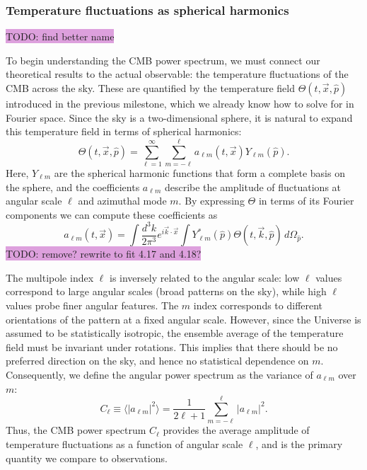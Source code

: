 \documentclass{aa}
\numberwithin{equation}{section}
\numberwithin{table}{section}
\numberwithin{figure}{section}
\begin{document}
\subsubsection{Temperature fluctuations as spherical harmonics}
\colorbox{Plum}{TODO: find better name}

To begin understanding the CMB power spectrum, we must connect our theoretical results to the actual observable: the temperature fluctuations of the CMB across the sky. These are quantified by the temperature field $\Theta(t,\vec{x},\hat{p})$ introduced in the previous milestone, which we already know how to solve for in Fourier space. 
Since the sky is a two-dimensional sphere, it is natural to expand this temperature field in terms of spherical harmonics:  
\begin{equation}
\Theta(t, \vec{x}, \hat{p}) = \sum_{\ell=1}^{\infty} \sum_{m=-\ell}^{\ell} a_{\ell m}(t, \vec{x}) Y_{\ell m}(\hat{p}).
\end{equation}
Here, $Y_{\ell m}$ are the spherical harmonic functions that form a complete basis on the sphere, and the coefficients $a_{\ell m}$ describe the amplitude of fluctuations at angular scale $\ell$ and azimuthal mode $m$. By expressing $\Theta$ in terms of its Fourier components we can compute these coefficients as
\begin{equation}
  a_{\ell m}(t,\vec{x}) = \int\frac{d^3k}{2\pi^3}e^{i\vec{k}\cdot\vec{x}}\int Y^*_{\ell m}(\hat{p})\Theta(t,\vec{k},\hat{p})\,d\Omega_{\hat{p}}. \label{eq: coeffs}
\end{equation}
\colorbox{Plum}{TODO: remove? rewrite to fit 4.17 and 4.18?}

The multipole index $\ell$ is inversely related to the angular scale: low $\ell$ values correspond to large angular scales (broad patterns on the sky), while high $\ell$ values probe finer angular features. The $m$ index corresponds to different orientations of the pattern at a fixed angular scale. However, since the Universe is assumed to be statistically isotropic, the ensemble average of the temperature field must be invariant under rotations. This implies that there should be no preferred direction on the sky, and hence no statistical dependence on $m$. Consequently, we define the angular power spectrum as the variance of $a_{\ell m}$ over $m$:  
\begin{equation}
C_\ell \equiv \langle |a_{\ell m}|^2 \rangle = \frac{1}{2\ell+1} \sum_{m=-\ell}^{\ell} |a_{\ell m}|^2.
\end{equation}
Thus, the CMB power spectrum $C_\ell$ provides the average amplitude of temperature fluctuations as a function of angular scale $\ell$, and is the primary quantity we compare to observations.
\end{document}
